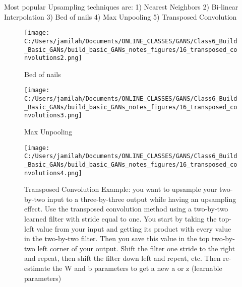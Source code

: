 \documentclass[11pt, onecolumn]{article}
\begin{document}
\begin{itemize}
Most popular Upsampling techniques are:
1) Nearest Neighbors
2) Bi-linear Interpolation
3) Bed of nails
4) Max Unpooling
5) Transposed Convolution

\begin{figure}[htp]
\begin{center}
\texttt{[image: C:/Users/jamilah/Documents/ONLINE\_CLASSES/GANS/Class6\_Build\_Basic\_GANs/build\_basic\_GANs\_notes\_figures/16\_transposed\_convolutions2.png]}
\end{center}
\caption{Bed of nails}
\label{16_transposed_convolutions2}
\end{figure}

\begin{figure}[htp]
\begin{center}
\texttt{[image: C:/Users/jamilah/Documents/ONLINE\_CLASSES/GANS/Class6\_Build\_Basic\_GANs/build\_basic\_GANs\_notes\_figures/16\_transposed\_convolutions3.png]}
\end{center}
\caption{Max Unpooling}
\label{16_transposed_convolutions3}
\end{figure}

\begin{figure}[htp]
\begin{center}
\texttt{[image: C:/Users/jamilah/Documents/ONLINE\_CLASSES/GANS/Class6\_Build\_Basic\_GANs/build\_basic\_GANs\_notes\_figures/16\_transposed\_convolutions4.png]}
\end{center}
\caption{Transposed Convolution Example: you want to upsample your two-by-two input to a three-by-three output while having an upsampling effect. Use the transposed convolution method using a two-by-two learned filter with stride equal to one. You start by taking the top-left value from your input and getting its product with every value in the two-by-two filter. Then you save this value in the top two-by-two left corner of your output. Shift the filter one stride to the right and repeat, then shift the filter down left and repeat, etc.  Then re-estimate the W and b parameters to get a new a or z (learnable parameters)}
\label{16_transposed_convolutions4}
\end{figure}


\end{itemize}
\end{document}
